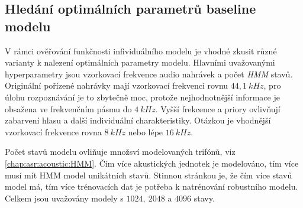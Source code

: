 
\subsection{Hledání optimálních parametrů baseline modelu}
\label{chap:construction:results:baseline}


V rámci ověřování funkčnosti infividuálního modelu je vhodné zkusit různé varianty k nalezení optimálních parametry modelu. Hlavními uvažovanými hyperparametry jsou vzorkovací frekvence audio nahrávek a počet \textit{HMM} stavů. Originální pořízené nahrávky mají vzorkovací frekvenci rovnu $44,1\ kHz$, pro úlohu rozpoznávání je to zbytečně moc, protože nejhodnotnější informace je obsažena ve frekvenčním pásmu do $4\ kHz$. Vyšší frekcence a priory ovlivňují zabarvení hlasu a další individuální charakteristiky. \cite{Psutka2006} Otázkou je vhodnější vzorkovací frekvence rovna $8\ kHz$ nebo lépe $16\ kHz$.

Počet stavů modelu ovliňuje množsví modelovaných trifónů, viz \ref{chap:asr:acoustic:HMM}. Čím více akustických jednotek je modelováno, tím více musí mít HMM model unikátních stavů. Stinnou stránkou je, že čím více stavů model má, tím více trénovacích dat je potřeba k natrénování robustního modelu. Celkem jsou uvažovány modely s $1024,\ 2048$ a $4096$ stavy.

